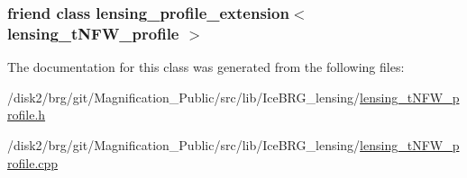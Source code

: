 \subsubsection[{lensing\+\_\+profile\+\_\+extension$<$ lensing\+\_\+t\+N\+F\+W\+\_\+profile $>$}]{\setlength{\rightskip}{0pt plus 5cm}friend class {\bf lensing\+\_\+profile\+\_\+extension}$<$ {\bf lensing\+\_\+t\+N\+F\+W\+\_\+profile} $>$\hspace{0.3cm}{\ttfamily [friend]}}\label{classIceBRG_1_1lensing__tNFW__profile_a959d8115518ab64335bb4b660a91e4e3}


The documentation for this class was generated from the following files\+:\begin{DoxyCompactItemize}
\item 
/disk2/brg/git/\+Magnification\+\_\+\+Public/src/lib/\+Ice\+B\+R\+G\+\_\+lensing/\hyperlink{lensing__tNFW__profile_8h}{lensing\+\_\+t\+N\+F\+W\+\_\+profile.\+h}\item 
/disk2/brg/git/\+Magnification\+\_\+\+Public/src/lib/\+Ice\+B\+R\+G\+\_\+lensing/\hyperlink{lensing__tNFW__profile_8cpp}{lensing\+\_\+t\+N\+F\+W\+\_\+profile.\+cpp}\end{DoxyCompactItemize}
